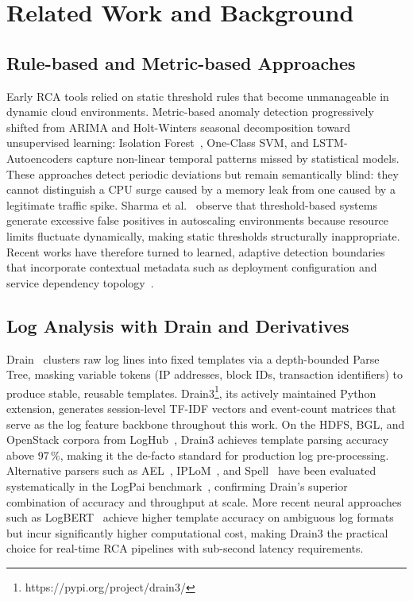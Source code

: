\documentclass[5p, times]{elsarticle}
\begin{document}
\section{Related Work and Background}\label{related}

\subsection{Rule-based and Metric-based Approaches}
Early RCA tools relied on static threshold rules that become unmanageable in dynamic cloud environments. Metric-based anomaly detection progressively shifted from ARIMA and Holt-Winters seasonal decomposition toward unsupervised learning: Isolation Forest~\cite{soldani2022}, One-Class SVM, and LSTM-Autoencoders capture non-linear temporal patterns missed by statistical models. These approaches detect periodic deviations but remain semantically blind: they cannot distinguish a CPU surge caused by a memory leak from one caused by a legitimate traffic spike. Sharma et
al.~\cite{sharma2023microservice} observe that threshold-based systems generate excessive false positives in autoscaling environments because resource limits fluctuate dynamically, making
static thresholds structurally inappropriate. Recent works have therefore turned to learned, adaptive detection boundaries that incorporate contextual metadata such as deployment configuration
and service dependency topology~\cite{chen2020unsupervised}.

\subsection{Log Analysis with Drain and Derivatives}
Drain~\cite{drain2017} clusters raw log lines into fixed templates via a depth-bounded Parse Tree, masking variable tokens (IP addresses, block IDs, transaction identifiers) to produce stable,
reusable templates. Drain3\footnote{https://pypi.org/project/drain3/}, its actively maintained Python extension, generates session-level TF-IDF vectors and event-count matrices that serve as the log feature backbone throughout this work. On the HDFS, BGL, and OpenStack corpora from LogHub~\cite{loghub2023}, Drain3 achieves template parsing accuracy above 97\,\%, making it the
de-facto standard for production log pre-processing. Alternative parsers such as AEL~\cite{jiang2008abstracting},
IPLoM~\cite{makanju2009clustering}, and Spell~\cite{du2016spell} have been evaluated systematically in the LogPai benchmark~\cite{zhu2019tools}, confirming Drain's superior combination of accuracy and throughput at scale. More recent neural approaches such as LogBERT~\cite{guo2021logbert} achieve higher template accuracy on ambiguous log formats but incur significantly higher computational cost, making Drain3 the practical choice for real-time RCA pipelines with sub-second latency requirements.
\end{document}
